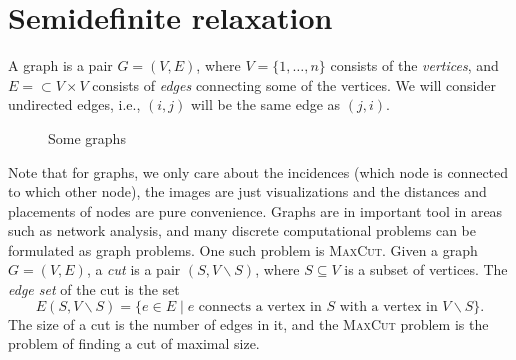 \section{Semidefinite relaxation}
A graph is a pair $G=(V,E)$, where $V=\{1,\dots,n\}$ consists of the {\em vertices}, and $E=\subset V\times V$ consists of {\em edges} connecting some of the vertices. We will consider undirected edges, i.e., $(i,j)$ will be the same edge as $(j,i)$. 
\begin{figure}[h!]
\centering
{}
\caption{Some graphs}
\end{figure}

Note that for graphs, we only care about the incidences (which node is connected to which other node), the images are just visualizations and the distances and placements of nodes are pure convenience.
Graphs are in important tool in areas such as network analysis, and many discrete computational problems can be formulated as graph problems. One such problem is \textsc{MaxCut}. Given a graph $G=(V,E)$, a {\em cut} is a pair $(S,V\backslash S)$, where $S\subseteq V$ is a subset of vertices. The {\em edge set} of the cut is the set
\begin{equation*}
 E(S,V\backslash S) = \{e\in E\mid e \text{ connects a vertex in } S \text{ with a vertex in } V\backslash S\}.
\end{equation*}
The size of a cut is the number of edges in it, and the \textsc{MaxCut} problem is the problem of finding a cut of maximal size. 

